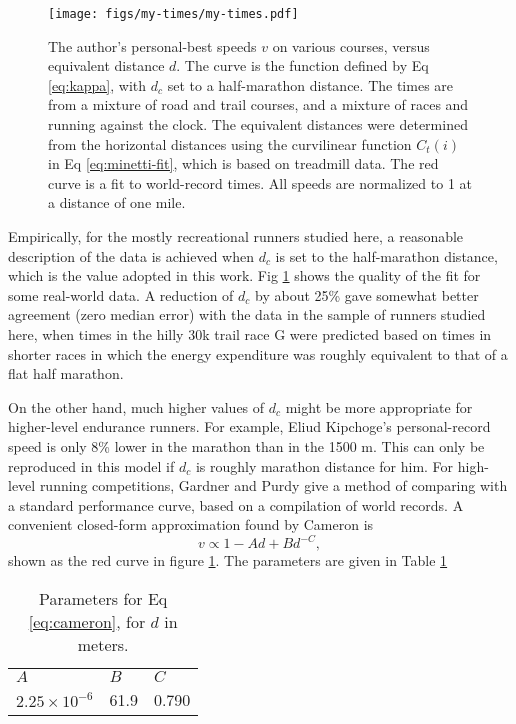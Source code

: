 \documentclass[10pt,letterpaper]{article}
\begin{document}
\begin{figure}[h]
\texttt{[image: figs/my-times/my-times.pdf]}
\centering
\caption{The author's personal-best speeds $v$ on various courses, versus equivalent distance $d$.
The curve is the function defined by Eq \ref{eq:kappa}, with $d_c$ set to a half-marathon distance.
The times are from a mixture of road and trail courses, and a mixture of races and running against the clock.
The equivalent distances were determined from the horizontal distances using the curvilinear
function $C_t(i)$ in Eq \ref{eq:minetti-fit}, which is based on treadmill data. The red curve is a 
fit to world-record times.\cite{cameron} All speeds are normalized to 1 at a distance of one mile.}
\label{fig:my-times}
\end{figure}

Empirically, for the mostly recreational runners studied here, a reasonable description of the data is achieved when
$d_c$ is set to the half-marathon distance, which is the value adopted in this work.
Fig \ref{fig:my-times} shows the quality of the fit for some real-world data.
A reduction of $d_c$ by about 25\% gave somewhat better agreement (zero median error) with the data in the sample of runners studied
here,  when times in the hilly 30k trail race G were
predicted based on times in shorter races in which the energy expenditure was roughly equivalent to that of
a flat half marathon.

On the other hand, much higher values of $d_c$ might be more appropriate for higher-level endurance runners.
For example, Eliud Kipchoge's personal-record
speed is only 8\% lower in the marathon than in the 1500 m. This can only be reproduced in this model if $d_c$
is roughly marathon distance for him.
For high-level running competitions, Gardner and Purdy give a
method of comparing with a standard performance curve, based on a compilation of world
records.\cite{gardner} A convenient closed-form approximation found by Cameron\cite{cameron} is
\begin{equation}\label{eq:cameron}
  v\propto 1-Ad+Bd^{-C},
\end{equation}
shown as the red curve in figure \ref{fig:my-times}. The parameters are given in Table \ref{table:cameron-parameters}

\begin{table}[h]
\caption{Parameters for Eq \eqref{eq:cameron}, for $d$ in meters.}
\begin{tabular}{lll}
$A$ & $B$ & $C$ \\
$2.25\times10^{-6}$ & 61.9 & 0.790
\end{tabular}
\label{table:cameron-parameters}
\end{table}
\end{document}
